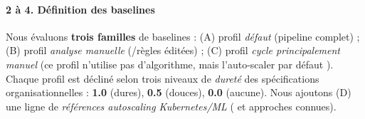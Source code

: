 \paragraph{2 à 4. Définition des baselines}

Nous évaluons \textbf{trois familles} de baselines : (A) profil \emph{défaut} (pipeline  complet) ; (B) profil \emph{analyse manuelle} (/règles éditées) ; (C) profil \emph{cycle principalement manuel} (ce profil n'utilise pas d'algorithme,  mais l'auto-scaler par défaut ). Chaque profil est décliné selon trois niveaux de \emph{dureté} des spécifications organisationnelles : \textbf{1.0} (dures), \textbf{0.5} (douces), \textbf{0.0} (aucune). Nous ajoutons (D) une ligne de \emph{références autoscaling Kubernetes/ML} ( et approches  connues).


